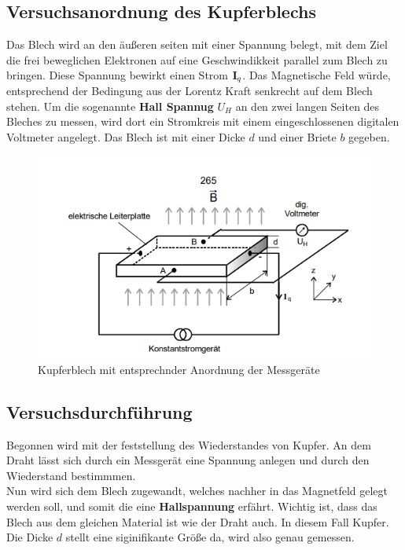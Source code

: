 \subsection{Versuchsanordnung des Kupferblechs}
\label{sec:Blech}
Das Blech wird an den äußeren seiten mit einer Spannung belegt, mit dem Ziel die frei beweglichen Elektronen auf eine Geschwindikkeit parallel zum 
Blech zu bringen. Diese Spannung bewirkt einen Strom $\text{\textbf{I}}_q$. Das Magnetische Feld würde, entsprechend der Bedingung aus der Lorentz Kraft %
senkrecht auf dem Blech stehen. Um die sogenannte \textbf{Hall Spannug} $U_H$ an den zwei langen Seiten des Bleches zu messen, wird dort ein Stromkreis
mit einem eingeschlossenen digitalen Voltmeter angelegt. Das Blech ist mit einer Dicke $d$ und einer Briete $b$ gegeben.

\begin{figure}
     \centering
     \includegraphics[width=\textwidth]{bilder/versuchsanordnung.png}
     \caption{Kupferblech mit entsprechnder Anordnung der Messgeräte}
     \label{fig:kupferblech}
\end{figure}

\subsection{Versuchsdurchführung}
Begonnen wird mit der feststellung des Wiederstandes von Kupfer. An dem Draht lässt sich durch ein Messgerät eine Spannung anlegen und durch %
den Wiederstand bestimmmen. \\

Nun wird sich dem Blech zugewandt, welches nachher in das Magnetfeld gelegt werden soll, und somit die eine \textbf{Hallspannung} erfährt.
Wichtig ist, dass das Blech aus dem gleichen Material ist wie der Draht auch. In diesem Fall Kupfer. Die Dicke $d$ stellt eine siginifikante Größe da, wird also genau gemessen.\\


